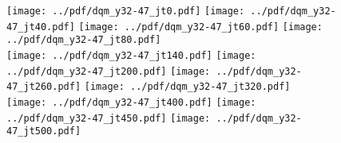 \documentclass[landscape,10pt]{beamer} %
\begin{document}
\newpage

\begin{figure}[p]
\texttt{[image: ../pdf/dqm\_y32-47\_jt0.pdf]}
\texttt{[image: ../pdf/dqm\_y32-47\_jt40.pdf]}
\texttt{[image: ../pdf/dqm\_y32-47\_jt60.pdf]}
\texttt{[image: ../pdf/dqm\_y32-47\_jt80.pdf]}\\
\texttt{[image: ../pdf/dqm\_y32-47\_jt140.pdf]}
\texttt{[image: ../pdf/dqm\_y32-47\_jt200.pdf]}
\texttt{[image: ../pdf/dqm\_y32-47\_jt260.pdf]}
\texttt{[image: ../pdf/dqm\_y32-47\_jt320.pdf]}\\
\texttt{[image: ../pdf/dqm\_y32-47\_jt400.pdf]}
\texttt{[image: ../pdf/dqm\_y32-47\_jt450.pdf]}
\texttt{[image: ../pdf/dqm\_y32-47\_jt500.pdf]}
\end{figure}
\end{document}
